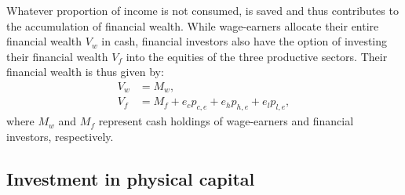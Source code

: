 \documentclass[authoryear]{article}
\begin{document}
Whatever proportion of income is not consumed, is saved and thus contributes to the accumulation of financial wealth. While wage-earners allocate their entire financial wealth $V_w$ in cash, financial investors also have the option of investing their financial wealth $V_f$ into the equities of the three productive sectors. Their financial wealth is thus given by: 
\begin{align}
V_w&=M_w, \\
V_f&=M_f+e_cp_{c,e}+e_hp_{h,e}+e_lp_{l,e},
\end{align}
where $M_w$ and $M_f$ represent cash holdings of wage-earners and financial investors, respectively.

\subsection{Investment in physical capital}
\label{sec:inv}
\end{document}
